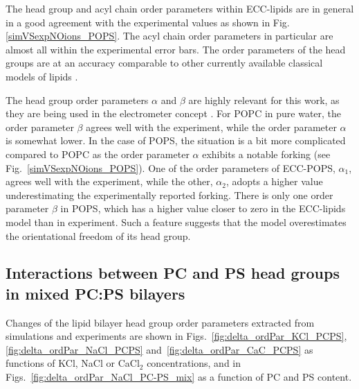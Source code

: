 \documentclass[journal=jpcbfk,manuscript=article]{achemso}
\begin{document}
The head group and acyl chain order parameters within ECC-lipids
are in general in a good agreement with the experimental values 
as shown in Fig. \ref{simVSexpNOions_POPS}. 
The acyl chain order parameters in particular are almost all within the experimental error bars.
The order parameters of the head groups are at an accuracy comparable to 
other currently available classical models of lipids \citep{botan15, catte16, Pluhackova2016}. 

The head group order parameters $\alpha$ and $\beta$ are highly relevant for this work,
as they are being used in the electrometer concept \cite{altenbach84, catte16, melcr18}.
For POPC in pure water, the order parameter $\beta$ agrees well with the experiment, 
while the order parameter $\alpha$ is somewhat lower. 
In the case of POPS, the situation is a bit more complicated
compared to POPC as the order parameter $\alpha$ exhibits a notable forking (see Fig.~\ref{simVSexpNOions_POPS}).
One of the order parameters of ECC-POPS, $\alpha_1$, agrees well with the experiment, 
while the other, $\alpha_2$, adopts a higher value underestimating the experimentally reported forking. 
There is only one order parameter $\beta$ in POPS, 
which has a higher value closer to zero in the ECC-lipids model than in experiment. 
Such a feature suggests that the model overestimates the orientational freedom of its head group. 

 
 
 
\subsection{Interactions between PC and PS head groups in mixed PC:PS bilayers}


Changes of the lipid bilayer head group order parameters extracted from simulations and 
experiments \cite{roux90} are shown in Figs.~\ref{fig:delta_ordPar_KCl_PCPS}, \ref{fig:delta_ordPar_NaCl_PCPS} 
and~\ref{fig:delta_ordPar_CaC_PCPS} as functions of KCl, NaCl or CaCl$_2$ concentrations,
and in Figs.~\ref{fig:delta_ordPar_NaCl_PC-PS_mix} as a function of PC and PS content. 
\end{document}
